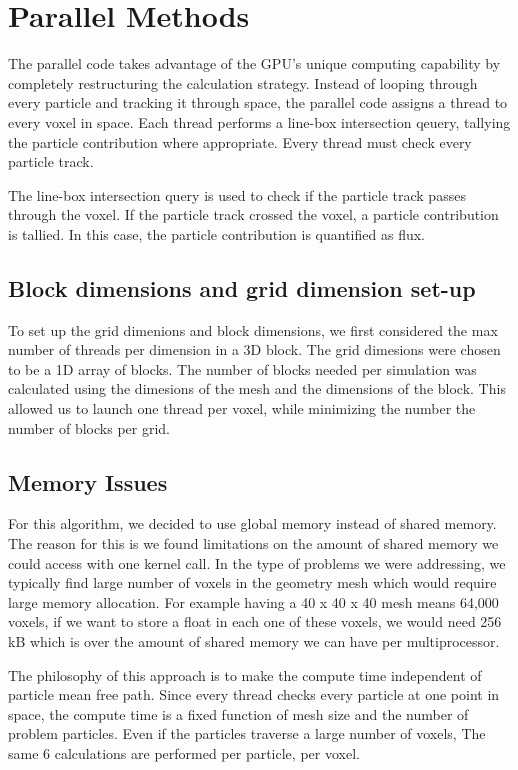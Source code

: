 \section{Parallel Methods}
The parallel code takes advantage of the GPU's unique computing capability by
completely restructuring the calculation strategy. Instead of looping through
every particle and tracking it through space, the parallel code assigns a thread
to every voxel in space. Each thread performs a line-box intersection qeuery,
tallying the particle contribution where appropriate. Every thread must check
every particle track. 

The line-box intersection query is used to check if the particle track passes 
through the voxel. If the particle track crossed the voxel, a particle contribution 
is tallied. In this case, the particle contribution is quantified as flux. 

\subsection{Block dimensions and grid dimension set-up}
To set up the grid dimenions and block dimensions, we first considered the max number of 
threads per dimension in a 3D block. 
The grid dimesions were chosen to be a 1D array of blocks. The number of blocks 
needed per simulation was calculated using the dimesions of the mesh and the 
dimensions of the block. This allowed us to launch one thread per voxel, while 
minimizing the number the number of blocks per grid. 

\subsection{Memory Issues}
For this algorithm, we decided to use global memory instead of shared memory. 
The reason for this is we found limitations on the amount of shared memory we 
could access with one kernel call. In the type of problems we were addressing, 
we typically find large number of voxels in the geometry mesh which would require 
large memory allocation. For example having a 40 x 40 x 40 mesh means 64,000 
voxels, if we want to store a float in each one of these voxels, we would need 
256 kB which is over the amount of shared memory we can have per multiprocessor.   


The philosophy of this approach is to make the compute time independent of
particle mean free path. Since every thread checks every particle at one point
in space, the compute time is a fixed function of mesh size and the number of
problem particles. Even if the particles traverse a large number of voxels, The
same 6 calculations are performed per particle, per voxel.

